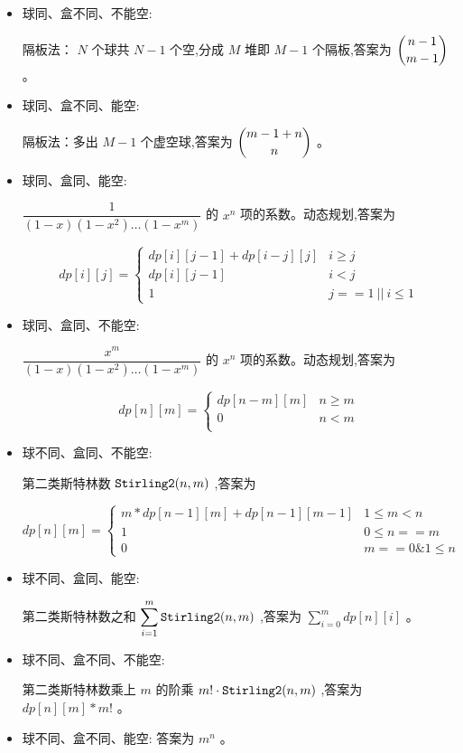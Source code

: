 \begin{itemize}
    \item 球同、盒不同、不能空:
    
    隔板法： $N$ 个球共 $N-1$ 个空,分成 $M$ 堆即 $M-1$ 个隔板,答案为 $\dbinom{n-1}{m-1}$ 。

    \item 球同、盒不同、能空:
    
    隔板法：多出 $M-1$ 个虚空球,答案为 $\dbinom{m-1+n}{n}$ 。

    \item 球同、盒同、能空:
    
    $\dfrac{1}{(1-x)(1-x^2)\dots(1-x^m)}$ 的 $x^n$ 项的系数。动态规划,答案为 

    $$dp[i][j]=
    \left\{\begin{matrix}
    dp[i][j-1]+dp[i-j][j]     & i\geq j  \\ 
    dp[i][j-1]                & i < j   \\ 
    1                         & j==1 \ || \ i \leq 1
    \end{matrix}\right.$$

    \item 球同、盒同、不能空:
    
    $\dfrac{x^m}{(1-x)(1-x^2)\dots(1-x^m)}$ 的 $x^n$ 项的系数。动态规划,答案为 

    $$dp[n][m]=
    \left\{\begin{matrix}
    dp[n-m][m]     & n\ge m  \\ 
    0              & n < m   \\ 
    \end{matrix}\right.$$

    \item 球不同、盒同、不能空:
    
    第二类斯特林数 ${\tt Stirling2}(n,m)$ ,答案为  

    $$dp[n][m]=
    \left\{\begin{matrix}
    m*dp[n-1][m]+dp[n-1][m-1] & 1 \le m < n\\ 
    1                         & 0 \le n == m\\ 
    0                         & m == 0 \& 1 \le n
    \end{matrix}\right.$$

    \item 球不同、盒同、能空:
    
    第二类斯特林数之和 $\displaystyle\sum_{i=1}^m{\tt Stirling2}(n,m)$ ,答案为 $\sum_{i = 0}^{m} dp[n][i]$ 。

    \item 球不同、盒不同、不能空:
    
    第二类斯特林数乘上 $m$ 的阶乘 $m!\cdot{\tt Stirling2}(n,m)$ ,答案为 $dp[n][m] * m!$ 。

    \item 球不同、盒不同、能空: 答案为 $m^n$ 。
\end{itemize}

